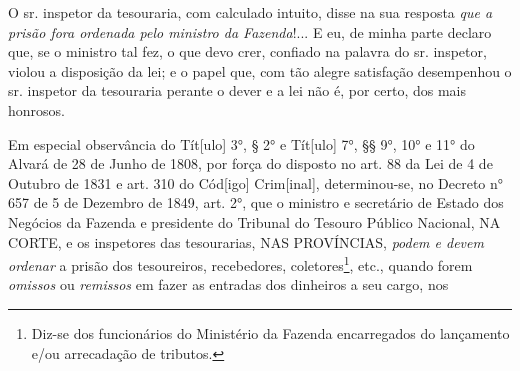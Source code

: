 O sr. inspetor da tesouraria, com calculado intuito, disse na sua
resposta \emph{que a prisão fora ordenada pelo ministro da Fazenda}!...
E eu, de minha parte declaro que, se o ministro tal fez, o que devo
crer, confiado na palavra do sr. inspetor, violou a disposição da lei; e
o papel que, com tão alegre satisfação desempenhou o sr. inspetor da
tesouraria perante o dever e a lei não é, por certo, dos mais honrosos.

Em especial observância do Tít{[}ulo{]} 3°, § 2° e Tít{[}ulo{]} 7°, §§
9°, 10° e 11° do Alvará de 28 de Junho de 1808, por força do disposto no
art. 88 da Lei de 4 de Outubro de 1831 e art. 310 do Cód{[}igo{]}
Crim{[}inal{]}, determinou-se, no Decreto n° 657 de 5 de Dezembro de
1849, art. 2°, que o ministro e secretário de Estado dos Negócios da
Fazenda e presidente do Tribunal do Tesouro Público Nacional, NA CORTE,
e os inspetores das tesourarias, NAS PROVÍNCIAS, \emph{podem e devem
ordenar} a prisão dos tesoureiros, recebedores, coletores\footnote{Diz-se
  dos funcionários do Ministério da Fazenda encarregados do lançamento
  e/ou arrecadação de tributos.}, etc., quando forem \emph{omissos} ou
\emph{remissos} em fazer as entradas dos dinheiros a seu cargo, nos
